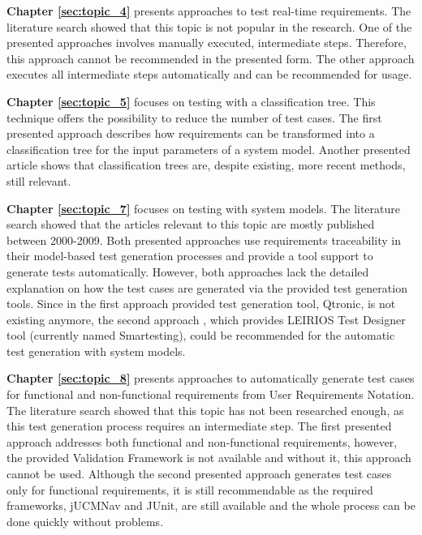 \textbf{Chapter \ref{sec:topic_4}} presents approaches to test real-time requirements. The literature search showed that this topic is not popular in the research. One of the presented approaches \cite{Siegl2010} involves manually executed, intermediate steps. Therefore, this approach cannot be recommended in the presented form. The other approach \cite{Guan2015} executes all intermediate steps automatically and can be recommended for usage.

\textbf{Chapter \ref{sec:topic_5}} focuses on testing with a classification tree. This technique offers the possibility to reduce the number of test cases. The first presented approach \cite{Conrad} describes how requirements can be transformed into a classification tree for the input parameters of a system model. Another presented article \cite{Belli} shows that classification trees are, despite existing, more recent methods, still relevant.

\textbf{Chapter \ref{sec:topic_7}} focuses on testing with system models. The literature search showed that the articles relevant to this topic are mostly published between 2000-2009. Both presented approaches use requirements traceability in their model-based test generation processes and provide a tool support to generate tests automatically. However, both approaches lack the detailed explanation on how the test cases are generated via the provided test generation tools. Since in the first approach \cite{Paper1} provided test generation tool, Qtronic, is not existing anymore, the second approach \cite{Paper2}, which provides LEIRIOS Test Designer tool (currently named Smartesting), could be recommended for the automatic test generation with system models.

\textbf{Chapter \ref{sec:topic_8}} presents approaches to automatically generate test cases for functional and non-functional requirements from User Requirements Notation. The literature search showed that this topic has not been researched enough, as this test generation process requires an intermediate step. The first presented approach \cite{ArnoldCorriveauShi2010} addresses both functional and non-functional requirements, however, the provided Validation Framework is not available and without it, this approach cannot be used. Although the second presented approach \cite{BoucherMussbacher2017} generates test cases only for functional requirements, it is still recommendable as the required frameworks, jUCMNav and JUnit, are still available and the whole process can be done quickly without problems. 

